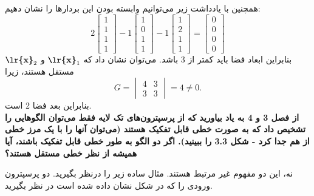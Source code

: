 \documentclass[a4paper,12pt]{report}
\begin{document}
  	   همچنین با یادداشت زیر می‌توانیم وابسته بودن این بردارها را نشان دهیم:
  	   $$
  	   2
  	   \begin{bmatrix}
	  	   	1 \\ 1 \\ 1 \\ 1
  	   \end{bmatrix}
       -1
       \begin{bmatrix}
       	1 \\ 0 \\ 1 \\ 1
       \end{bmatrix}
   	   -1
   	   \begin{bmatrix}
   	   	1 \\ 2 \\ 1 \\ 1
   	   \end{bmatrix}
       =
       \begin{bmatrix}
       	0 \\ 0 \\ 0 \\ 0
       \end{bmatrix}
  	   $$
  	   بنابراین ابعاد فضا باید کمتر از 3 باشد. می‌توان نشان داد که
  	   $ \textbf{\lr{x}}_1 $
  	    و
  	    $ \textbf{\lr{x}}_2 $
  	     مستقل هستند، زیرا
  	     $$
  	     G=
  	     \begin{vmatrix}
	  	     4 & 3 \\
	  	     3 & 3
  	     \end{vmatrix}
       	 =4 \neq 0.
  	     $$
  	     بنابراین بعد فضا 2 است.\\
  	     
  	     \hspace{-2cm}\textbf{}
  	     \textbf
  	     {
  	     	از فصل 3 و 4 به یاد بیاورید که از پرسپترون‌های تک لایه فقط می‌توان الگوهایی را تشخیص داد که به صورت خطی قابل تفکیک هستند (می‌توان آنها را با یک مرز خطی از هم جدا کرد - شکل 3.3 را ببینید). اگر دو الگو به طور خطی قابل تفکیک باشند، آیا همیشه از نظر خطی مستقل هستند؟
  	     }
       
       
  	     نه، این دو مفهوم غیر مرتبط هستند. مثال ساده زیر را درنظر بگیرید. دو پرسپترون ورودی را که در شکل  نشان داده شده است در نظر بگیرید. 
  	     
\end{document}
